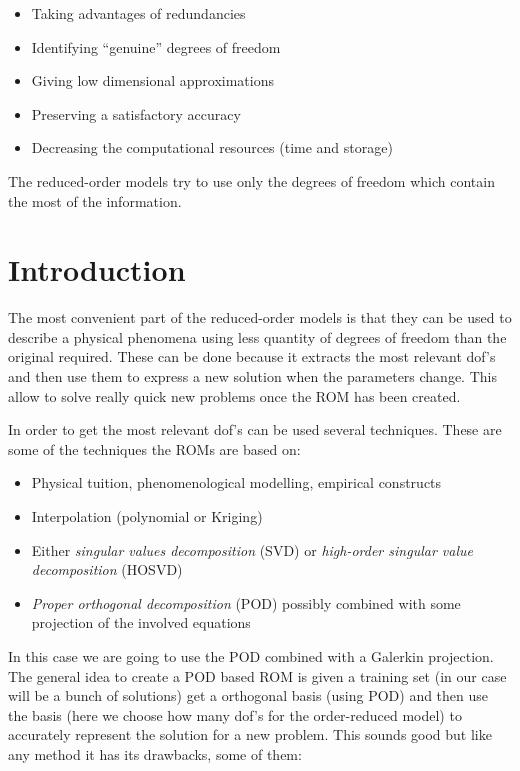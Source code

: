 \documentclass[twoside,11pt]{Latex/Classes/PhDthesisPSnPDF_jacob}
\begin{document}
\begin{itemize}
\item Taking advantages of redundancies
\item Identifying ``genuine'' degrees of freedom
\item Giving low dimensional approximations
\item Preserving a satisfactory accuracy
\item Decreasing the computational resources (time and storage)
\end{itemize}

The reduced-order models try to use only the degrees of freedom which contain the most of the information.


\section{Introduction}

The most convenient part of the reduced-order models is that they can be used to describe a physical phenomena using less quantity of degrees of freedom than the original required. These can be done because it extracts the most relevant dof's and then use them to express a new solution when the parameters change. This allow to solve really quick new problems once the ROM has been created.

In order to get the most relevant dof's can be used several techniques. These are some of the techniques the ROMs are based on:

\begin{itemize}
\item Physical tuition, phenomenological modelling, empirical constructs
\item Interpolation (polynomial or Kriging)
\item Either \textit{singular values decomposition} (SVD) or \textit{high-order singular value decomposition} (HOSVD)
\item \textit{Proper orthogonal decomposition} (POD) possibly combined with some projection of the involved equations
\end{itemize}

In this case we are going to use the POD combined with a Galerkin projection. The general idea to create a POD based ROM is given a training set (in our case will be a bunch of solutions) get a orthogonal basis (using POD) and then use the basis (here we choose how many dof's for the order-reduced model) to accurately represent the solution for a new problem. This sounds good but like any method it has its drawbacks, some of them:
\end{document}
